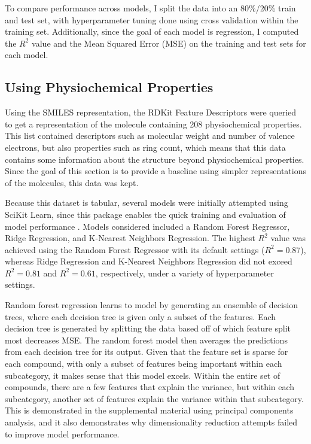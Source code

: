 \documentclass[12pt, oneside]{article}   	%
\begin{document}
To compare performance across models, I split the data into an 80\%/20\% train and test set, with hyperparameter tuning done using cross validation within the training set. Additionally, since the goal of each model is regression, I computed the $R^2$ value and the Mean Squared Error (MSE) on the training and test sets for each model. 

\subsection{Using Physiochemical Properties}
Using the SMILES representation, the RDKit Feature Descriptors were queried to get a representation of the molecule containing 208 physiochemical properties. This list contained descriptors such as molecular weight and number of valence electrons, but also properties such as ring count, which means that this data contains some information about the structure beyond physiochemical properties. Since the goal of this section is to provide a baseline using simpler representations of the molecules, this data was kept.

Because this dataset is tabular, several models were initially attempted using SciKit Learn, since this package enables the quick training and evaluation of model performance \cite{scikit-learn}. Models considered included a Random Forest Regressor, Ridge Regression, and K-Nearest Neighbors Regression. The highest $R^2$ value was achieved using the Random Forest Regressor with its default settings ($R^2=0.87$), whereas Ridge Regression and K-Nearest Neighbors Regression did not exceed $R^2= 0.81$ and $R^2=0.61$, respectively, under a variety of hyperparameter settings.

Random forest regression learns to model by generating an ensemble of decision trees, where each decision tree is given only a subset of the features. Each decision tree is generated by splitting the data based off of which feature split most decreases MSE. The random forest model then averages the predictions from each decision tree for its output. Given that the feature set is sparse for each compound, with only a subset of features being important within each subcategory, it makes sense that this model excels. Within the entire set of compounds, there are a few features that explain the variance, but within each subcategory, another set of features explain the variance within that subcategory. This is demonstrated in the supplemental material using principal components analysis, and it also demonstrates why dimensionality reduction attempts failed to improve model performance.
\end{document}
